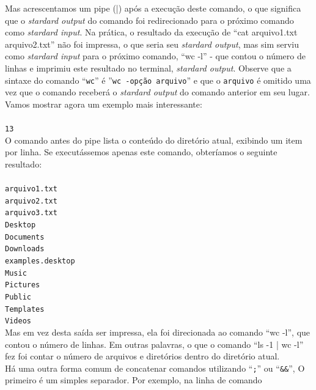 \begin{refsection}
Mas acrescentamos um pipe (|) após a execução deste comando, o que significa que o \textit{stardard output} do comando foi redirecionado para o próximo comando como \textit{stardard input}. Na prática, o resultado da execução de ``cat arquivo1.txt arquivo2.txt'' não foi impressa, o que seria seu \textit{stardard output}, mas sim serviu como \textit{stardard input} para o próximo comando, ``wc -l'' - que contou o número de linhas e imprimiu este resultado no terminal, \textit{stardard output}. Observe que a sintaxe do comando ``\texttt{wc}'' é ''\texttt{wc -opção arquivo}'' e que o \texttt{arquivo} é omitido uma vez que o comando receberá o \textit{stardard output} do comando anterior em seu lugar.\\

 Vamos mostrar agora um exemplo mais interessante:\\
\\
\indent\texttt{13}\\

O comando antes do pipe lista o conteúdo do diretório atual, exibindo um item por linha. Se executássemos apenas este comando, obteríamos o seguinte resultado:\\
\\
\texttt{arquivo1.txt\\
arquivo2.txt\\
arquivo3.txt\\
Desktop\\
Documents\\
Downloads\\
examples.desktop\\
Music\\
Pictures\\
Public\\
Templates\\
Videos}\\

Mas em vez desta saída ser impressa, ela foi direcionada ao comando ``wc -l'', que contou o número de linhas. Em outras palavras, o que o comando ``ls -1 | wc -l'' fez foi contar o número de arquivos e diretórios dentro do diretório atual.\\
Há uma outra forma comum de concatenar comandos utilizando ``\texttt{;}'' ou ``\texttt{\&\&}'', O primeiro é um simples separador. Por exemplo, na linha de comando

\\


\end{refsection}
